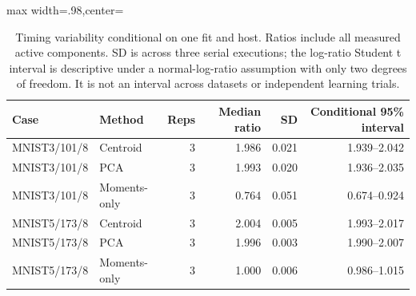 \begin{table}[tbp]
\centering
\caption{Timing variability conditional on one fit and host. Ratios include all measured active components. SD is across three serial executions; the log-ratio Student t interval is descriptive under a normal-log-ratio assumption with only two degrees of freedom. It is not an interval across datasets or independent learning trials.}
\label{tab:review-uncertainty}
\begin{adjustbox}{max width=.98\textwidth,center=\textwidth}
\begin{tabular}{llrrrr}
\toprule
Case & Method & Reps & Median ratio & SD & Conditional 95\% interval\\
\midrule
MNIST3/101/8 & Centroid & 3 & 1.986 & 0.021 & 1.939--2.042\\
MNIST3/101/8 & PCA & 3 & 1.993 & 0.020 & 1.936--2.035\\
MNIST3/101/8 & Moments-only & 3 & 0.764 & 0.051 & 0.674--0.924\\
MNIST5/173/8 & Centroid & 3 & 2.004 & 0.005 & 1.993--2.017\\
MNIST5/173/8 & PCA & 3 & 1.996 & 0.003 & 1.990--2.007\\
MNIST5/173/8 & Moments-only & 3 & 1.000 & 0.006 & 0.986--1.015\\
\bottomrule
\end{tabular}
\end{adjustbox}
\end{table}
